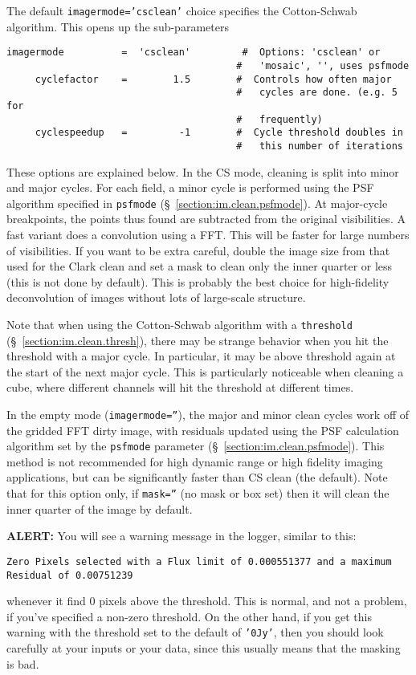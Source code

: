 The default {\tt imagermode='csclean'} choice specifies the Cotton-Schwab algorithm.  This
opens up the sub-parameters
\small
\begin{verbatim}
imagermode          =  'csclean'         #  Options: 'csclean' or
                                        #   'mosaic', '', uses psfmode
     cyclefactor    =        1.5        #  Controls how often major
                                        #   cycles are done. (e.g. 5 for
                                        #   frequently)
     cyclespeedup   =         -1        #  Cycle threshold doubles in
                                        #   this number of iterations

\end{verbatim}
\normalsize
These options are explained below.
In the CS mode, cleaning is split into minor and major cycles. For each field, a
minor cycle is performed using the PSF algorithm specified in
{\tt psfmode} (\S~\ref{section:im.clean.psfmode}).
At major-cycle breakpoints, the points
thus found are subtracted from the original visibilities. A fast
variant does a convolution using a FFT. This will be faster for large
numbers of visibilities.  If you want to be extra careful, double the image 
size from that used for the Clark clean and set a mask to clean only
the inner quarter or less (this is not done by default).
This is probably the best choice for high-fidelity deconvolution 
of images without lots of large-scale structure.

Note that when using the Cotton-Schwab algorithm with a {\tt threshold}
(\S~\ref{section:im.clean.thresh}), there may be strange
behavior when you hit the threshold with a major cycle.  In
particular, it may be above threshold again at the start of the next
major cycle.  This is particularly noticeable when cleaning a cube,
where different channels will hit the threshold at different times.

In the empty mode ({\tt imagermode=''}), the major and minor
clean cycles work off of the gridded FFT dirty image, with residuals
updated using the PSF calculation algorithm set by the {\tt psfmode}
parameter (\S~\ref{section:im.clean.psfmode}).  This method is not
recommended for high dynamic range or high fidelity imaging 
applications, but can be significantly faster than CS clean (the default).
Note that for this option only, if {\tt mask=''} (no mask or box
set) then it will clean the inner quarter of the image by
default.

{\bf ALERT:} You will see a warning message in the logger, 
similar to this:
\small
\begin{verbatim}
Zero Pixels selected with a Flux limit of 0.000551377 and a maximum Residual of 0.00751239
\end{verbatim}
\normalsize
whenever it find 0 pixels above the threshold.  This is normal,
and not a problem, if you've specified a non-zero threshold.
On the other hand, if you get this warning with the threshold set to
the default of {\tt '0Jy'}, then you should look carefully at your
inputs or your data, since this usually means that the masking is bad.

